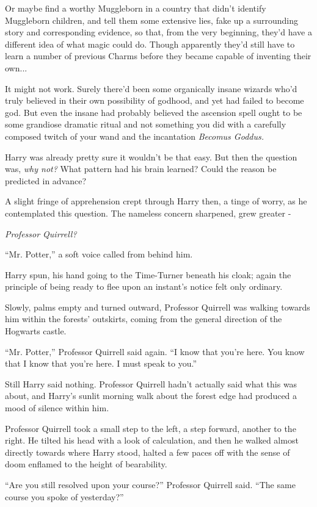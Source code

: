 Or maybe find a worthy Muggleborn in a country that didn't identify
Muggleborn children, and tell them some extensive lies, fake up a
surrounding story and corresponding evidence, so that, from the very
beginning, they'd have a different idea of what magic could do. Though
apparently they'd still have to learn a number of previous Charms before
they became capable of inventing their own...

It might not work. Surely there'd been some organically insane wizards
who'd truly believed in their own possibility of godhood, and yet had
failed to become god. But even the insane had probably believed the
ascension spell ought to be some grandiose dramatic ritual and not
something you did with a carefully composed twitch of your wand and the
incantation \emph{Becomus Goddus.}

Harry was already pretty sure it wouldn't be that easy. But then the
question was, \emph{why not?} What pattern had his brain learned? Could
the reason be predicted in advance?

A slight fringe of apprehension crept through Harry then, a tinge of
worry, as he contemplated this question. The nameless concern sharpened,
grew greater -

\emph{Professor Quirrell?}

``Mr. Potter,'' a soft voice called from behind him.

Harry spun, his hand going to the Time-Turner beneath his cloak; again
the principle of being ready to flee upon an instant's notice felt only
ordinary.

Slowly, palms empty and turned outward, Professor Quirrell was walking
towards him within the forests' outskirts, coming from the general
direction of the Hogwarts castle.

``Mr. Potter,'' Professor Quirrell said again. ``I know that you're
here. You know that I know that you're here. I must speak to you.''

Still Harry said nothing. Professor Quirrell hadn't actually said what
this was about, and Harry's sunlit morning walk about the forest edge
had produced a mood of silence within him.

Professor Quirrell took a small step to the left, a step forward,
another to the right. He tilted his head with a look of calculation, and
then he walked almost directly towards where Harry stood, halted a few
paces off with the sense of doom enflamed to the height of bearability.

``Are you still resolved upon your course?'' Professor Quirrell said.
``The same course you spoke of yesterday?''

